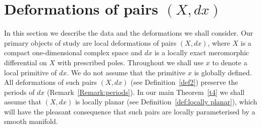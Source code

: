 \documentclass[11pt,twoside]{amsart}
\theoremstyle{plain}
\newcommand{\Tm}{\mathcal{T}}
\newcommand{\dfx}{dx}
\begin{document}
\section{Deformations of pairs $(X,\dfx)$}\label{sec:def1}
In this section we describe the data and the deformations we shall consider. Our primary objects of study are local deformations of pairs $(X,\dfx)$, where $X$ is a compact one-dimensional complex space and $ \dfx $ is a locally exact meromorphic differential on $X$ with prescribed poles.  Throughout we shall use $x$ to denote a local primitive of $\dfx$. We do not assume that the primitive $x$ is globally defined. All deformations of such pairs $(X,\dfx)$ (see Definition~\ref {def2}) preserve the periods of $\dfx $ (Remark~\ref{Remark:periods}). In our main Theorem~\ref{t4} we shall assume that $(X,\dfx)$ is locally planar (see Definition~\ref{def:locally planar}), which  will have the pleasant consequence that such pairs are locally parameterised by a smooth manifold. 
\end{document}
